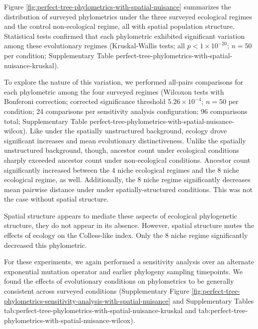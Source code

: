Figure \ref{fig:perfect-tree-phylometrics-with-spatial-nuisance} summarizes the distribution of surveyed phylometrics under the three surveyed ecological regimes and the control non-ecological regime, all with spatial population structure.
Statistical tests confirmed that each phylometric exhibited significant  variation among these evolutionary regimes (Kruskal-Wallis tests; all $p < 1\times10^{-20}$; $n=50$ per condition; Supplementary Table perfect-tree-phylometrics-with-spatial-nuisance-kruskal).

To explore the nature of this variation, we performed all-pairs comparisons for each phylometric among the four surveyed regimes (Wilcoxon tests with Bonferoni correction; corrected significance threshold $5.26 \times 10^{-4}$; $n=50$ per condition; 24 comparisons per sensitivity analysis configuration; 96 comparisons total; Supplementary Table perfect-tree-phylometrics-with-spatial-nuisance-wilcox).
Like under the spatially unstructured background, ecology drove significant increases and mean evolutionary distinctiveness. 
Unlike the spatially unstructured background, though, ancestor count under ecological conditions sharply exceeded ancestor count under non-ecological conditions.
Ancestor count significantly increased between the 4 niche ecological regimes and the 8 niche ecological regime, as well.
Additionally,  the 8 niche regime significantly decreases mean pairwise distance under under spatially-structured conditions.
This was not the case without spatial structure.

Spatial structure appears to mediate these aspects of ecological phylogenetic structure, they do not appear in its absence.
However, spatial structure mutes the effects of ecology on the Colless-like index.
Only the 8 niche regime significantly decreased this phylometric. 

For these experiments, we again performed a sensitivity analysis over an alternate exponential mutation operator and earlier phylogeny sampling timepoints.
We found the effects of evolutionary conditions on phylometrics to be generally consistent across surveyed conditions (Supplementary Figure \ref{fig:perfect-tree-phylometrics-sensitivity-analysis-with-spatial-nuisance} and Supplementary Tables tab:perfect-tree-phylometrics-with-spatial-nuisance-kruskal and tab:perfect-tree-phylometrics-with-spatial-nuisance-wilcox). 



